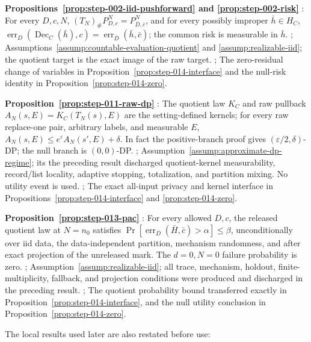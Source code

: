 \noindent\textbf{  Propositions~\ref{prop:step-002-iid-pushforward} and \ref{prop:step-002-risk} }:  For every \(D,c,N\), \((T_N)_\#P_{D,c}^N=P_{\bar D,\bar c}^N\), and for every possibly improper \(\bar h\in H_C\), \(\operatorname{err}_D(\operatorname{Dec}_C(\bar h),c)=\operatorname{err}_{\bar D}(\bar h,\bar c)\); the common risk is measurable in \(\bar h\). ;  Assumptions~\ref{assump:countable-evaluation-quotient} and \ref{assump:realizable-iid}; the quotient target is the exact image of the raw target. ;  The zero-residual change of variables in Proposition~\ref{prop:step-014-interface} and the null-risk identity in Proposition~\ref{prop:step-014-zero}. \par
\noindent\textbf{ Proposition~\ref{prop:step-011-raw-dp} }:  The quotient law \(K_C\) and raw pullback \(A_N(s,E)=K_C(T_N(s),E)\) are the setting-defined kernels; for every raw replace-one pair, arbitrary labels, and measurable \(E\), \(A_N(s,E)\leq e^\varepsilon A_N(s',E)+\delta\). In fact the  positive-branch proof gives \((\varepsilon/2,\delta)\)-DP; the null branch is \((0,0)\)-DP. ;  Assumption~\ref{assump:approximate-dp-regime}; its the preceding result discharged quotient-kernel measurability, record/list locality, adaptive stopping, totalization, and partition mixing. No utility event is used. ;  The exact all-input privacy and kernel interface in Propositions~\ref{prop:step-014-interface} and \ref{prop:step-014-zero}. \par
\noindent\textbf{ Proposition~\ref{prop:step-013-pac} }:  For every allowed \(D,c\), the released quotient law at \(N=n_0\) satisfies \(\Pr[\operatorname{err}_{\bar D}(\bar H,\bar c)>\alpha]\leq\beta\), unconditionally over iid data, the data-independent partition, mechanism randomness, and after exact projection of the unreleased mark. The \(d=0,N=0\) failure probability is zero. ;  Assumption~\ref{assump:realizable-iid}; all trace, mechanism, holdout, finite-multiplicity, fallback, and projection conditions were produced and discharged in the preceding result. ;  The quotient probability bound transferred exactly in Proposition~\ref{prop:step-014-interface}, and the null utility conclusion in Proposition~\ref{prop:step-014-zero}. \par

The local results used later are also restated before use:

